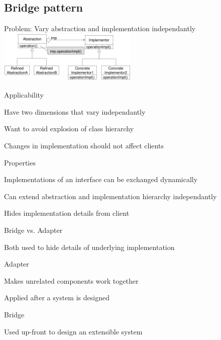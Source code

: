 \subsection{Bridge pattern}
\enumstart
	\item Problem: Vary abstraction and implementation independantly
	\\ \includegraphics[width=0.5\textwidth]{img/bridge_pattern.png}
	\item Applicability
	\enumstart
		\item Have two dimensions that vary independantly
		\item Want to avoid explosion of class hierarchy
		\item Changes in implementation should not affect clients
	\enumend
	\item Properties
	\enumstart
		\item Implementations of an interface can be exchanged dynamically
		\item Can extend abstraction and implementation hierarchy independantly
		\item Hides implementation details from client
	\enumend
	\item Bridge vs. Adapter
	\enumstart
		\item Both used to hide details of underlying implementation
		\item Adapter
		\enumstart
			\item Makes unrelated components work together
			\item Applied after a system is designed
		\enumend
		\item Bridge
		\enumstart
			\item Used up-front to design an extensible system
		\enumend
	\enumend
\enumend
